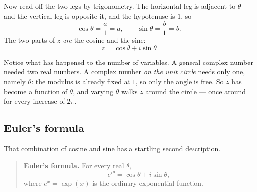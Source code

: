 \documentclass[11pt]{article}
\theoremstyle{definition}
\theoremstyle{remark}
\newcommand{\Rez}{\operatorname{Re}}
\newcommand{\Imz}{\operatorname{Im}}
\newcommand{\cpoint}[5]{%
  \fill[#3] (#1,#2) circle (2.1pt);
  \node[#5,font=\scriptsize,#3] at (#1,#2) {#4};
}
\begin{document}
Now read off the two legs by trigonometry. The horizontal leg is adjacent to
$\theta$ and the vertical leg is opposite it, and the hypotenuse is $1$, so
\[
  \cos\theta = \frac{a}{1} = a,
  \qquad
  \sin\theta = \frac{b}{1} = b .
\]
The two parts of $z$ \emph{are} the cosine and the sine:
\[
  \boxed{\;z = \cos\theta + i\sin\theta\;}
\]

\begin{center}
\end{center}

\noindent Notice what has happened to the number of variables. A general complex
number needed two real numbers. A complex number \emph{on the unit circle} needs
only one, namely $\theta$: the modulus is already fixed at $1$, so only the
angle is free. So $z$ has become a function of $\theta$, and varying $\theta$
walks $z$ around the circle --- once around for every increase of $2\pi$.

\subsection{Euler's formula}
That combination of cosine and sine has a startling second description.

\begin{quote}
\textbf{Euler's formula.} For every real $\theta$,
\[
  e^{i\theta} = \cos\theta + i\sin\theta ,
\]
where $e^{x}=\exp(x)$ is the ordinary exponential function.
\end{quote}
\end{document}
